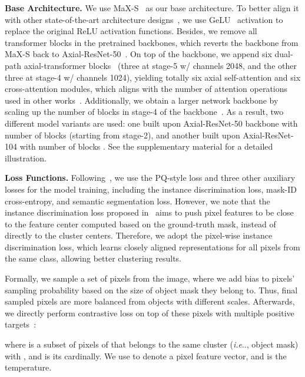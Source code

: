 \documentclass[10pt,twocolumn,letterpaper]{article}
\makeatletter
\DeclareRobustCommand\onedot{\futurelet\@let@token\@onedot}
\def\@onedot{\ifx\@let@token.\else.\null\fi\xspace}
\def\ie{\emph{i.e}\onedot} \def\Ie{\emph{I.e}\onedot}
\makeatother
\begin{document}
\vspace{0.5ex}
\noindent\textbf{Base Architecture.} We use MaX-S~\cite{wang2021max} as our base architecture. To better align it with other state-of-the-art architecture designs~\cite{liu2021swin}, we use GeLU~\cite{hendrycks2016gaussian} activation to replace the original ReLU activation functions. Besides, we remove all transformer blocks in the pretrained backbones, which reverts the backbone from MaX-S back to Axial-ResNet-50~\cite{wang2020axial}.
On top of the backbone, we append six dual-path axial-transformer blocks~\cite{wang2021max} (three at stage-5 w/ channels 2048, and the other three at stage-4 w/ channels 1024), yielding totally six axial self-attention and six cross-attention modules, which aligns with the number of attention operations used in other works~\cite{carion2020end,cheng2021per}.
Additionally, we obtain a larger network backbone by scaling up the number of blocks in stage-4 of the backbone~\cite{swidernet_2020}. As a result, two different model variants are used: one built upon Axial-ResNet-50 backbone with number of blocks  (starting from stage-2), and another built upon Axial-ResNet-104 with number of blocks . See the supplementary material for a detailed illustration.

\vspace{0.5ex}
\noindent\textbf{Loss Functions.} Following~\cite{wang2021max}, we use the PQ-style loss and three other auxiliary losses for the model training, including the instance discrimination loss, mask-ID cross-entropy, and semantic segmentation loss. However, we note that the instance discrimination loss proposed in~\cite{wang2021max} aims to push pixel features to be close to the feature center computed based on the ground-truth mask,
instead of directly to the cluster centers.
Therefore, we adopt the pixel-wise instance discrimination loss, which learns closely aligned representations for all pixels from the same class, allowing better clustering results.


Formally, we sample a set of pixels  from the image, where we add bias to pixels' sampling probability based on the size of object mask they belong to. Thus, final sampled pixels are more balanced from objects with different scales. Afterwards, we directly perform contrastive loss on top of these pixels with multiple positive targets~\cite{khosla2020supervised}:

where  is a subset of pixels of  that belongs to the same cluster (\ie, object mask) with , and  is its cardinally. We use  to denote a pixel feature vector, and  is the temperature.
\end{document}
